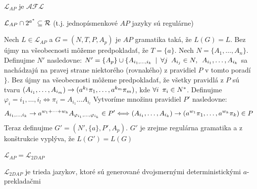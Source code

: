 \begin{veta}
    $\mathcal{L}_{AP}$ je $\mathcal{AFL}$
\end{veta}

\begin{veta}
    $\mathcal{L}_{AP}\cap 2^{a^{*}}\subseteq\mathcal{R}$ (t.j.
    jednopísmenkové $AP$ jazyky sú regulárne)
\end{veta}

\begin{dokaz}
    Nech $L\in\mathcal{L}_{AP}$ a $G=(N,T,P,A_p)$ je $AP$ gramatika
    taká, že $L(G)=L$. Bez újmy na všeobecnosti môžeme predpokladať,
    že $T=\{a\}$. Nech \mbox{$N=\{A_1,\dots,A_n\}$}. Definujme $N'$
    nasledovne: $N'=\{A_p\}\cup\{A_{i_1,\dots,i_k}\enspace |\enspace\forall j\enspace
    A_{i_j}\in N,\enspace A_{i_1},\dots,A_{i_k}$ sa nachádzajú na pravej
    strane niektorého (rovnakého) z pravidiel $P$ v tomto poradí$\}$.
    Bez újmy na všeobecnosti môžeme pred\-pokla\-dať, že všetky
    pravidlá z $P$ sú tvaru
    $(A_{i_1},\dots,A_{i_m})\rightarrow(a^{k_1}\pi_1,\dots,a^{k_m}\pi_m)$, kde
    $\forall i\enspace \pi_i\in N^*$. Definujme
    $\varphi_i=i_1,\dots,i_l\Longleftrightarrow\pi_i=A_{i_1}\dots
    A_{i_l}$ Vytvoríme množinu pravidiel $P'$ nasledovne:
    \[
    A_{i_1,\dots,i_k}\rightarrow
    a^{w_1+\cdots+w_k}A_{\varphi_{i_1},\dots,\varphi_{i_k}}\in
    P'\Longleftrightarrow
    (A_{i_1},\dots,A_{i_k})\rightarrow(a^{w_1}\pi_1,\dots,a^{w_k}\pi_k)\in P
    \]
    Teraz definujme $G'=(N',\{a\},P',A_p)$. $G'$ je zrejme regulárna
    gramatika a z konštrukcie vyplýva, že $L(G')=L(G)$
\end{dokaz}

\begin{veta}
    $\mathcal{L}_{AP}=\mathcal{L}_{2DAP}$
\end{veta}

\begin{poznamka}
    $\mathcal{L}_{2DAP}$ je trieda jazykov, ktoré sú generované
    dvojsmernými determi\-nis\-tic\-ký\-mi $a$-prek\-la\-dač\-mi
\end{poznamka}
